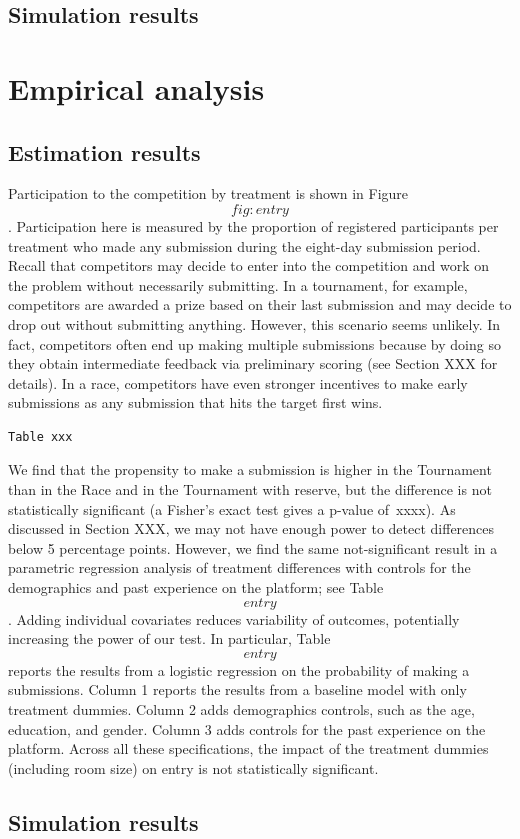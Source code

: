 \documentclass[12pt,]{article}
\begin{document}
\subsection{Simulation results}\label{simulation-results}

\section{Empirical analysis}\label{empirical-analysis}

\subsection{Estimation results}\label{estimation-results-1}

Participation to the competition by treatment is shown in Figure
\[fig:entry\]. Participation here is measured by the proportion of
registered participants per treatment who made any submission during the
eight-day submission period. Recall that competitors may decide to enter
into the competition and work on the problem without necessarily
submitting. In a tournament, for example, competitors are awarded a
prize based on their last submission and may decide to drop out without
submitting anything. However, this scenario seems unlikely. In fact,
competitors often end up making multiple submissions because by doing so
they obtain intermediate feedback via preliminary scoring (see Section
XXX for details). In a race, competitors have even stronger incentives
to make early submissions as any submission that hits the target first
wins.

\begin{verbatim}
Table xxx
\end{verbatim}

We find that the propensity to make a submission is higher in the
Tournament than in the Race and in the Tournament with reserve, but the
difference is not statistically significant (a Fisher's exact test gives
a p-value of~xxxx). As discussed in Section XXX, we may not have enough
power to detect differences below 5 percentage points. However, we find
the same not-significant result in a parametric regression analysis of
treatment differences with controls for the demographics and past
experience on the platform; see Table \[entry\]. Adding individual
covariates reduces variability of outcomes, potentially increasing the
power of our test. In particular, Table \[entry\] reports the results
from a logistic regression on the probability of making a submissions.
Column 1 reports the results from a baseline model with only treatment
dummies. Column 2 adds demographics controls, such as the age,
education, and gender. Column 3 adds controls for the past experience on
the platform. Across all these specifications, the impact of the
treatment dummies (including room size) on entry is not statistically
significant.

\subsection{Simulation results}\label{simulation-results-1}

\renewcommand\refname{References}

\end{document}

